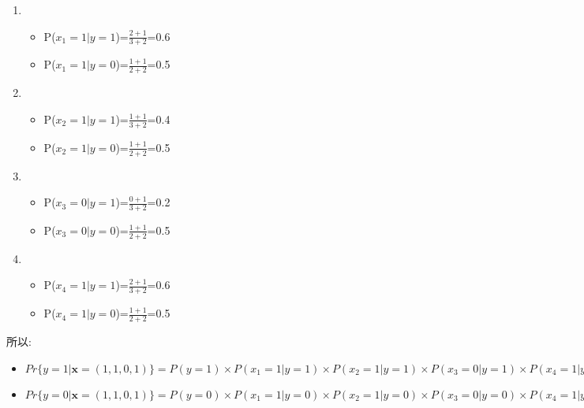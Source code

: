 \documentclass[11pt, a4paper, UTF8]{ctexart}
\begin{document}
\begin{solution}
\begin{enumerate}
\begin{enumerate}
\begin{itemize}
	\end{itemize}
	\item \begin{itemize}
		\item P($x_1=1|y=1$)=$\frac{2+1}{3+2}$=0.6
		\item P($x_1=1|y=0$)=$\frac{1+1}{2+2}$=0.5
	\end{itemize}
	\item \begin{itemize}
		\item P($x_2=1|y=1$)=$\frac{1+1}{3+2}$=0.4
		\item P($x_2=1|y=0$)=$\frac{1+1}{2+2}$=0.5
	\end{itemize}
	\item \begin{itemize}
		\item P($x_3=0|y=1$)=$\frac{0+1}{3+2}$=0.2
		\item P($x_3=0|y=0$)=$\frac{1+1}{2+2}$=0.5
	\end{itemize}
	\item \begin{itemize}
		\item P($x_4=1|y=1$)=$\frac{2+1}{3+2}$=0.6
		\item P($x_4=1|y=0$)=$\frac{1+1}{2+2}$=0.5
	\end{itemize}
	\end{enumerate}
		所以:
		\begin{itemize}
	\item $Pr\{ y=1 | \mathbf{x}=(1,1,0,1) \}=P(y=1)\times P(x_1=1|y=1)\times P(x_2=1|y=1)\times P(x_3=0|y=1) \times P(x_4=1|y=1)=0.016457$
	\item $Pr\{ y=0 | \mathbf{x}=(1,1,0,1) \}=P(y=0)\times P(x_1=1|y=0)\times P(x_2=1|y=0)\times P(x_3=0|y=0) \times P(x_4=1|y=0)=0.026785$
		\end{itemize}
\end{enumerate}
    
\end{solution}
\end{document}
